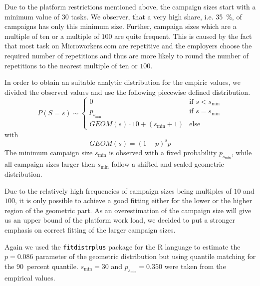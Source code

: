 Due to the platform restrictions mentioned above, the campaign sizes start with a minimum value of \(30\) tasks.
We observer, that a very high share, i.e. \SI{35}{\percent}, of campaigns has only this minimum size.
Further, campaign sizes which are a multiple of ten or a multiple of \(100\) are quite frequent.
This is caused by the fact that most task on Microworkers.com are repetitive and the employers choose the required number of repetitions and thus are more likely to round the number of repetitions to the nearest multiple of ten or \(100\).

In order to obtain an suitable analytic distribution for the empiric values, we divided the observed values and use the following piecewise defined distribution.
\begin{equation*}
P(S=s) \sim
\begin{cases}
  0 & \text{if } s < s_{\min}\\
  p_{s_{\min}} & \text{if } s=s_{\min} \\
  GEOM(s) \cdot 10 + (s_{\min}+1) & \text{else}
\end{cases}
\end{equation*}
with 
\begin{equation*}
GEOM(s) = {(1-p)}^s p
\end{equation*}
The minimum campaign size \(s_{\min}\) is observed with a fixed probability \(p_{s_{\min}}\), while all campaign sizes larger then \(s_{\min}\) follow a shifted and scaled geometric distribution.

Due to the relatively high frequencies of campaign sizes being multiples of \(10\) and \(100\), it is only possible to achieve a good fitting either for the lower or the higher region of the geometric part.
As an overestimation of the campaign size will give us an upper bound of the platform work load, we decided to put a stronger emphasis on correct fitting of the larger campaign sizes.

Again we used the \texttt{fitdistrplus} package for the R language to estimate the \(p=0.086\) parameter of the geometric distribution but using quantile matching for the \SI{90}{percent} quantile.
\(s_{\min}=30\) and \(p_{s_{\min}}=0.350\) were taken from the empirical values.

